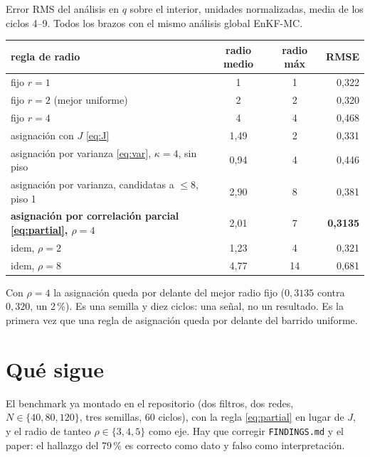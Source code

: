 \documentclass[11pt]{article}
\begin{document}
Error RMS del análisis en $q$ sobre el interior, unidades normalizadas, media de los ciclos 4--9.
Todos los brazos con el mismo análisis global EnKF-MC.

\begin{center}\begin{tabular}{@{}lccr@{}}\toprule
regla de radio & radio medio & radio máx & RMSE \\ \midrule
fijo $r=1$ & 1 & 1 & 0,322 \\
fijo $r=2$ (mejor uniforme) & 2 & 2 & 0,320 \\
fijo $r=4$ & 4 & 4 & 0,468 \\ \midrule
asignación con $J$ \eqref{eq:J} & 1,49 & 2 & 0,331 \\
asignación por varianza \eqref{eq:var}, $\kappa=4$, sin piso & 0,94 & 4 & 0,446 \\
asignación por varianza, candidatas a $\le 8$, piso 1 & 2,90 & 8 & 0,381 \\ \midrule
\textbf{asignación por correlación parcial \eqref{eq:partial}, $\rho=4$} & 2,01 & 7 & \textbf{0,3135} \\
\quad idem, $\rho=2$ & 1,23 & 4 & 0,321 \\
\quad idem, $\rho=8$ & 4,77 & 14 & 0,681 \\ \bottomrule
\end{tabular}\end{center}

Con $\rho=4$ la asignación queda por delante del mejor radio fijo ($0{,}3135$ contra $0{,}320$,
un 2\,\%). Es una semilla y diez ciclos: una señal, no un resultado. Es la primera vez que una
regla de asignación queda por delante del barrido uniforme.

\section{Qué sigue}

El benchmark ya montado en el repositorio (dos filtros, dos redes, $N\in\{40,80,120\}$, tres
semillas, 60 ciclos), con la regla \eqref{eq:partial} en lugar de $J$, y el radio de tanteo
$\rho\in\{3,4,5\}$ como eje. Hay que corregir \texttt{FINDINGS.md} y el paper: el hallazgo del
79\,\% es correcto como dato y falso como interpretación.
\end{document}
